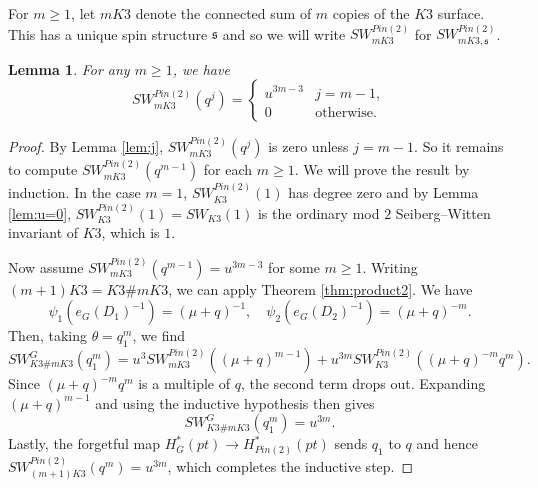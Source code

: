 \documentclass{amsart}
\newtheorem{lemma}[theorem]{Lemma}
\theoremstyle{definition}
\theoremstyle{remark}
\numberwithin{equation}{section}
\begin{document}
For $m \ge 1$, let $mK3$ denote the connected sum of $m$ copies of the $K3$ surface. This has a unique spin structure $\mathfrak{s}$ and so we will write $SW^{Pin(2)}_{mK3}$ for $SW^{Pin(2)}_{mK3,\mathfrak{s}}$.

\begin{lemma}\label{lem:mk3}
For any $m \ge 1$, we have
\[
SW^{Pin(2)}_{mK3}( q^j) = \begin{cases} u^{3m-3} & j = m-1, \\ 0 & \text{otherwise}. \end{cases}
\]
\end{lemma}
\begin{proof}
By Lemma \ref{lem:j}, $SW^{Pin(2)}_{mK3}(q^j)$ is zero unless $j=m-1$. So it remains to compute $SW^{Pin(2)}_{mK3}(q^{m-1})$ for each $m \ge 1$. We will prove the result by induction. In the case $m=1$, $SW^{Pin(2)}_{K3}(1)$ has degree zero and by Lemma \ref{lem:u=0}, $SW^{Pin(2)}_{K3}(1) = SW_{K3}(1)$ is the ordinary mod $2$ Seiberg--Witten invariant of $K3$, which is $1$.

Now assume $SW^{Pin(2)}_{mK3}(q^{m-1}) = u^{3m-3}$ for some $m \ge 1$. Writing $(m+1)K3 = K3 \# mK3$, we can apply Theorem \ref{thm:product2}. We have
\[
\psi_1 (e_G(D_1)^{-1}) = (\mu + q)^{-1}, \quad \psi_2 (e_G(D_2)^{-1} ) = (\mu + q)^{-m}.
\]
Then, taking $\theta = q_1^{m}$, we find
\[
SW^{G}_{K3 \# mK3}( q_1^{m}) = u^3 SW_{mK3}^{Pin(2)}( (\mu+q)^{m-1} ) + u^{3m} SW_{K3}^{Pin(2)}(  (\mu+q)^{-m} q^m ).
\]
Since $(\mu+q)^{-m}q^m$ is a multiple of $q$, the second term drops out. Expanding $(\mu+q)^{m-1}$ and using the inductive hypothesis then gives
\[
SW^{G}_{K3 \# mK3}( q_1^{m}) = u^{3m}.
\]
Lastly, the forgetful map $H^*_{G}(pt) \to H^*_{Pin(2)}(pt)$ sends $q_1$ to $q$ and hence \linebreak $SW^{Pin(2)}_{(m+1)K3}(q^m) = u^{3m}$, which completes the inductive step.
\end{proof}
\end{document}
